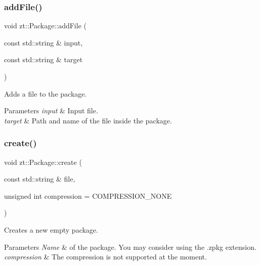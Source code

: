 \subsubsection{\texorpdfstring{add\+File()}{addFile()}}
{\footnotesize\ttfamily void zt\+::\+Package\+::add\+File (\begin{DoxyParamCaption}\item[{const std\+::string \&}]{input,  }\item[{const std\+::string \&}]{target }\end{DoxyParamCaption})}



Adds a file to the package. 


\begin{DoxyParams}{Parameters}
{\em input} & Input file. \\
\hline
{\em target} & Path and name of the file inside the package. \\
\hline
\end{DoxyParams}
\mbox{\label{classzt_1_1_package_a985b5fd2f225911709782ec42ea8dc48}} 
\subsubsection{\texorpdfstring{create()}{create()}}
{\footnotesize\ttfamily void zt\+::\+Package\+::create (\begin{DoxyParamCaption}\item[{const std\+::string \&}]{file,  }\item[{unsigned int}]{compression = {\ttfamily COMPRESSION\+\_\+NONE} }\end{DoxyParamCaption})}



Creates a new empty package. 


\begin{DoxyParams}{Parameters}
{\em Name} & of the package. You may consider using the .zpkg extension. \\
\hline
{\em compression} & The compression is not supported at the moment. \\
\hline
\end{DoxyParams}
\mbox{\label{classzt_1_1_package_ab30b4acb16a680075b9d61de978181f4}} 
